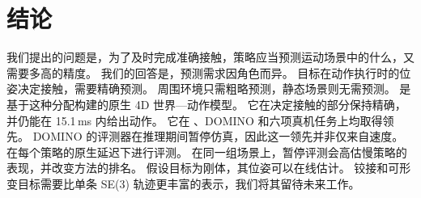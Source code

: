 \section{结论}
\label{sec:conclusion}

我们提出的问题是，为了及时完成准确接触，策略应当预测运动场景中的什么，又需要多高的精度。
我们的回答是，预测需求因角色而异。
目标在动作执行时的位姿决定接触，需要精确预测。
周围环境只需粗略预测，静态场景则无需预测。
\ours 是基于这种分配构建的原生 4D 世界—动作模型。
它在决定接触的部分保持精确，并仍能在 15.1\,ms 内给出动作。
它在 \bench、DOMINO 和六项真机任务上均取得领先。
DOMINO 的评测器在推理期间暂停仿真，因此这一领先并非仅来自速度。
\bench 在每个策略的原生延迟下进行评测。
在同一组场景上，暂停评测会高估慢策略的表现，并改变方法的排名。
\ours 假设目标为刚体，其位姿可以在线估计。
铰接和可形变目标需要比单条 SE(3) 轨迹更丰富的表示，我们将其留待未来工作。
